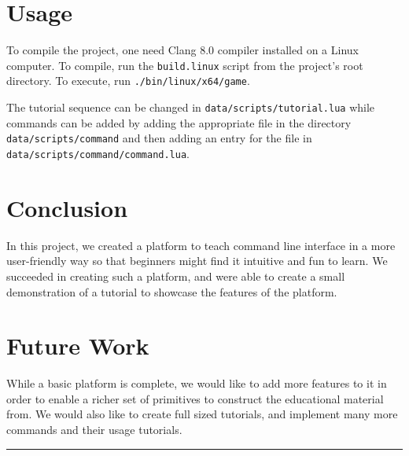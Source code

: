 \documentclass[a4paper]{article}
\begin{document}
\section{Usage}
To compile the project, one need Clang 8.0 compiler installed on a Linux computer. To compile, run the \texttt{build.linux} script from the project's root directory. To execute, run \texttt{./bin/linux/x64/game}.

The tutorial sequence can be changed in \texttt{data/scripts/tutorial.lua} while commands can be added by adding the appropriate file in the directory \texttt{data/scripts/command} and then adding an entry for the file in \texttt{data/scripts/command/command.lua}.

\section{Conclusion}
In this project, we created a platform to teach command line interface in a more user-friendly way so that beginners might find it intuitive and fun to learn. We succeeded in creating such a platform, and were able to create a small demonstration of a tutorial to showcase the features of the platform.

\section{Future Work}
While a basic platform is complete, we would like to add more features to it in order to enable a richer set of primitives to construct the educational material from. We would also like to create full sized tutorials, and implement many more commands and their usage tutorials.

\vspace{10cm}
\noindent\rule[0.25\baselineskip]{\textwidth}{1pt}






\end{document}
